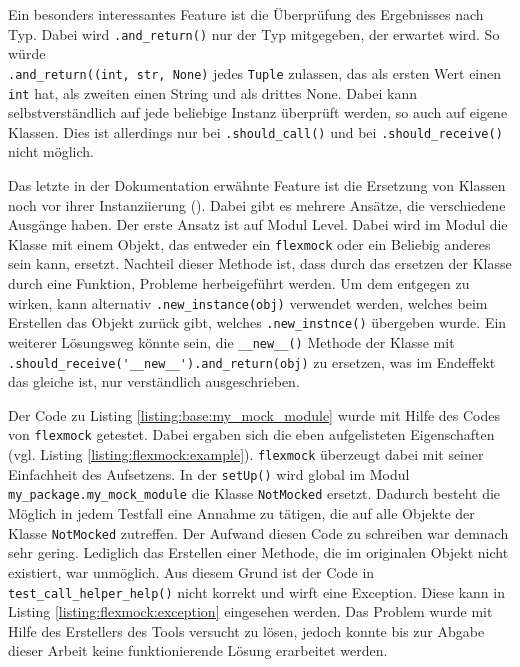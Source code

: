 Ein besonders interessantes Feature ist die Überprüfung des Ergebnisses nach
Typ. Dabei wird \lstinline{.and_return()} nur der Typ mitgegeben, der erwartet
wird. So würde
\\%
\lstinline{.and_return((int, str, None)} jedes \lstinline{Tuple}
zulassen, das als ersten Wert einen \lstinline{int} hat, als zweiten einen
String und als drittes None. Dabei kann selbstverständlich auf jede beliebige
Instanz überprüft werden, so auch auf eigene Klassen. Dies ist allerdings nur
bei \lstinline{.should_call()} und bei \lstinline{.should_receive()} nicht
möglich.

Das letzte in der Dokumentation erwähnte Feature ist die Ersetzung von Klassen
noch vor ihrer Instanziierung (\cite{flexmock:docs:0.10.3}). Dabei gibt es
mehrere Ansätze, die verschiedene Ausgänge haben. Der erste Ansatz ist
auf Modul Level. Dabei wird im Modul die Klasse mit einem Objekt, das
entweder ein \lstinline{flexmock} oder ein Beliebig anderes sein kann, ersetzt.
Nachteil dieser Methode ist, dass durch das ersetzen der Klasse durch eine
Funktion, Probleme herbeigeführt werden. Um dem entgegen zu wirken, kann
alternativ \lstinline{.new_instance(obj)} verwendet werden, welches beim
Erstellen das Objekt zurück gibt, welches \lstinline{.new_instnce()} übergeben
wurde. Ein weiterer Lösungsweg könnte sein, die \lstinline{__new__()} Methode
der Klasse mit \lstinline{.should_receive('__new__').and_return(obj)} zu
ersetzen, was im Endeffekt das gleiche ist, nur verständlich ausgeschrieben.
\newline

Der Code zu Listing \ref{listing:base:my_mock_module} wurde mit Hilfe des Codes
von \lstinline{flexmock} getestet. Dabei ergaben sich die eben aufgelisteten
Eigenschaften (vgl. Listing \ref{listing:flexmock:example}).
\lstinline{flexmock} überzeugt dabei mit seiner Einfachheit des Aufsetzens. In
der \lstinline{setUp()} wird global im Modul 
\lstinline{my_package.my_mock_module} die Klasse \lstinline{NotMocked} ersetzt.
Dadurch besteht die Möglich in jedem Testfall eine Annahme zu tätigen, die
auf alle Objekte der Klasse \lstinline{NotMocked} zutreffen. Der Aufwand diesen
Code zu schreiben war demnach sehr gering. Lediglich das Erstellen einer
Methode, die im originalen Objekt nicht existiert, war unmöglich. Aus diesem
Grund ist der Code in \lstinline{test_call_helper_help()} nicht korrekt und
wirft eine Exception. Diese kann in Listing \ref{listing:flexmock:exception}
eingesehen werden. Das Problem wurde mit Hilfe des Erstellers des Tools
versucht zu lösen, jedoch konnte bis zur Abgabe dieser Arbeit keine
funktionierende Lösung erarbeitet werden.
\newline

